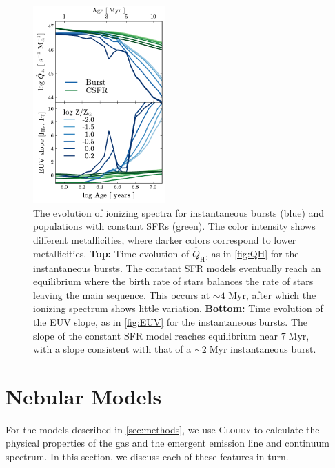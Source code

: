 \documentclass[linenumbers, trackchanges, tighten]{aastex61}%
\newcommand{\Fig}[1]{\autoref{fig:#1}}
\newcommand{\Sec}[1]{\autoref{sec:#1}}
\newcommand{\Cloudy}{\textsc{Cloudy}\xspace}
\newcommand{\QHat}{\ensuremath{\hat{Q}_{\mathrm{H}}}}
\begin{document}
\begin{figure}[!htbp]
  \begin{centering}
    \includegraphics[width=0.45\textwidth]{f4.pdf}
    \caption{The evolution of ionizing spectra for instantaneous bursts (blue) and populations with constant SFRs (green). The color intensity shows different metallicities, where darker colors correspond to lower metallicities. \textbf{Top:} Time evolution of \QHat{}, as in \Fig{QH} for the instantaneous bursts. The constant SFR models eventually reach an equilibrium where the birth rate of stars balances the rate of stars leaving the main sequence. This occurs at ${\sim}4$ Myr, after which the ionizing spectrum shows little variation. \textbf{Bottom: } Time evolution of the EUV slope, as in \Fig{EUV} for the instantaneous bursts. The slope of the constant SFR model reaches equilibrium near $7\;$Myr, with a slope consistent with that of a ${\sim}2\;$Myr instantaneous burst.}
    \label{fig:CSFHQ}
  \end{centering}
\end{figure}

\section{Nebular Models}\label{sec:models}

For the models described in \Sec{methods}, we use \Cloudy to calculate the physical properties of the gas and the emergent emission line and continuum spectrum. In this section, we discuss each of these features in turn.
\end{document}
